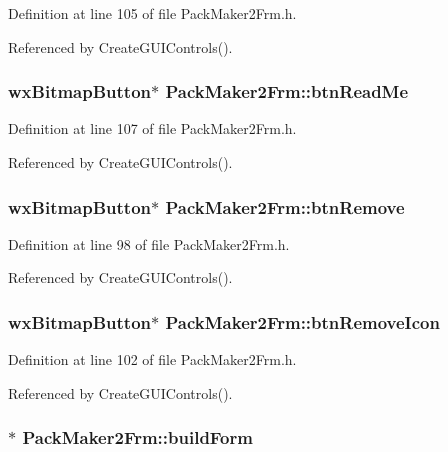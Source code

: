 Definition at line 105 of file Pack\-Maker2Frm.h.

Referenced by Create\-GUIControls().
\subsubsection{\setlength{\rightskip}{0pt plus 5cm}wx\-Bitmap\-Button$\ast$ {\bf Pack\-Maker2Frm::btn\-Read\-Me}\hspace{0.3cm}{\tt  [private]}}\label{class_pack_maker2_frm_d53594aab83ed314d9eb535206f6ad22}




Definition at line 107 of file Pack\-Maker2Frm.h.

Referenced by Create\-GUIControls().
\subsubsection{\setlength{\rightskip}{0pt plus 5cm}wx\-Bitmap\-Button$\ast$ {\bf Pack\-Maker2Frm::btn\-Remove}\hspace{0.3cm}{\tt  [private]}}\label{class_pack_maker2_frm_4b63c8c32fe8d40a412559218800f067}




Definition at line 98 of file Pack\-Maker2Frm.h.

Referenced by Create\-GUIControls().
\subsubsection{\setlength{\rightskip}{0pt plus 5cm}wx\-Bitmap\-Button$\ast$ {\bf Pack\-Maker2Frm::btn\-Remove\-Icon}\hspace{0.3cm}{\tt  [private]}}\label{class_pack_maker2_frm_82280fe469ea7a0100edcb62b0eb3061}




Definition at line 102 of file Pack\-Maker2Frm.h.

Referenced by Create\-GUIControls().
\subsubsection{$\ast$ {\bf Pack\-Maker2Frm::build\-Form}\hspace{0.3cm}{\tt  [private]}}\label{class_pack_maker2_frm_c3de0fa10b686acca08c66a758ff98ea}




